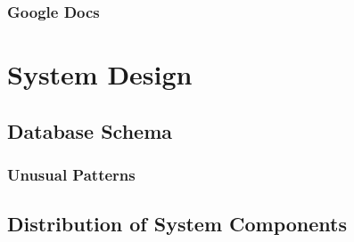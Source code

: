 \subsubsection{Google Docs}


\section{System Design}

\subsection{Database Schema}

\subsubsection{Unusual Patterns}

\subsection{Distribution of System Components}




